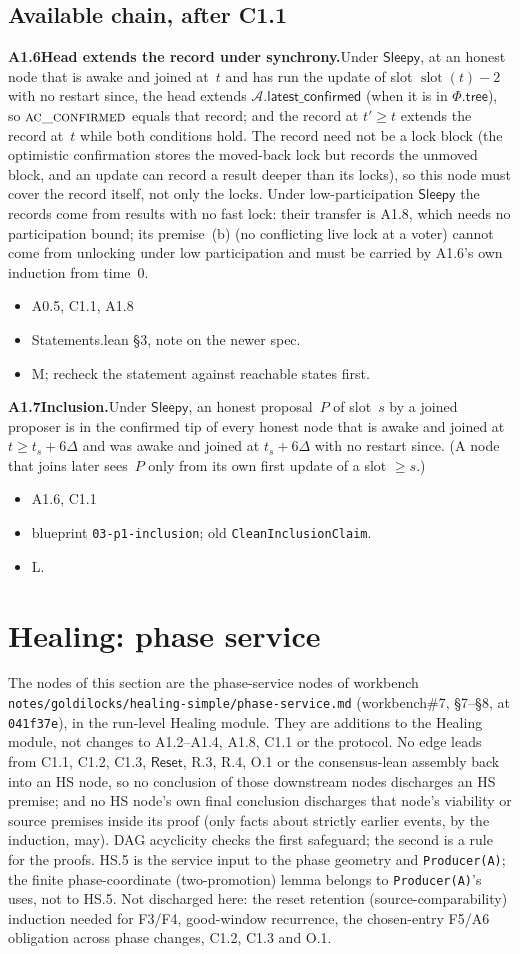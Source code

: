 \documentclass{article}
\newcommand{\slot}{\operatorname{slot}}
\newcommand{\AC}{\mathcal A}
\newcommand{\Fr}{\Phi}
\newcommand{\fname}[1]{\text{\textsc{#1}}}
\newcommand{\latestConfirmed}{\mathsf{latest\_confirmed}}
\newcommand{\dagnode}[6]{%
\par\medskip\noindent\textbf{#1\enspace #2.}\enspace #3
\begin{itemize}[leftmargin=2.2em,itemsep=0pt,topsep=2pt]
\item[\emph{Uses}] #4
\item[\emph{Evid.}] #5
\item[\emph{Task}] #6
\end{itemize}}
\begin{document}
\subsection{Available chain, after C1.1}

\dagnode{A1.6}{Head extends the record under synchrony}{Under $\mathsf{Sleepy}$,
at an honest node that is awake and joined at~$t$ and has run the update of
slot $\slot(t)-2$ with no restart since, the head extends $\AC.\latestConfirmed$
(when it is in $\Fr.\mathsf{tree}$), so $\fname{ac\_confirmed}$ equals that
record; and the record at $t'\geq t$ extends the record at~$t$ while both
conditions hold.  The record need not be a lock block (the optimistic
confirmation stores the moved-back lock but records the unmoved block, and an
update can record a result deeper than its locks), so this node must cover the
record itself, not only the locks.  Under low-participation
$\mathsf{Sleepy}$ the records come from results with no fast lock: their
transfer is A1.8, which needs no participation bound; its premise~(b) (no
conflicting live lock at a voter) cannot come from unlocking under low
participation and must be carried by A1.6's own induction from time~$0$.}
{A0.5, C1.1, A1.8}{Statements.lean \S3, note on the newer spec.}{M; recheck the
statement against reachable states first.}

\dagnode{A1.7}{Inclusion}{Under $\mathsf{Sleepy}$, an honest proposal~$P$ of
slot~$s$ by a joined proposer is in the confirmed tip of every honest node that
is awake and joined at $t\geq t_s+6\Delta$ and was awake and joined at
$t_s+6\Delta$ with no restart since.  (A node that joins later sees~$P$ only
from its own first update of a slot $\geq s$.)}
{A1.6, C1.1}{blueprint \texttt{03-p1-inclusion}; old
\texttt{CleanInclusionClaim}.}{L.}

\section{Healing: phase service}\label{sec:healing-service}

The nodes of this section are the phase-service nodes of workbench
\texttt{notes/goldilocks/healing-simple/phase-service.md} (workbench\#7,
\S7--\S8, at \texttt{041f37e}), in the run-level Healing module.  They are
additions to the Healing module, not changes to A1.2--A1.4, A1.8, C1.1 or the
protocol.  No edge leads from C1.1, C1.2, C1.3, $\mathsf{Reset}$, R.3, R.4,
O.1 or the consensus-lean assembly back into an HS node, so no conclusion of
those downstream nodes discharges an HS premise; and no HS node's own final
conclusion discharges that node's viability or source premises inside its
proof (only facts about strictly earlier events, by the induction, may).  DAG
acyclicity checks the first safeguard; the second is a rule for the proofs.  HS.5 is the service input to
the phase geometry and \texttt{Producer(A)}; the finite phase-coordinate
(two-promotion) lemma belongs to \texttt{Producer(A)}'s uses, not to HS.5.
Not discharged here: the reset retention (source-comparability) induction
needed for F3/F4, good-window recurrence, the chosen-entry F5/A6 obligation
across phase changes, C1.2, C1.3 and O.1.
\end{document}
